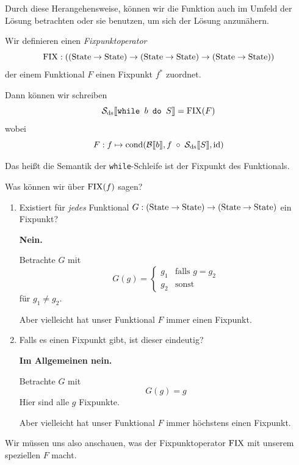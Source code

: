 Durch diese Herangehensweise, können wir die Funktion auch im Umfeld der Lösung betrachten oder sie benutzen, um sich der Lösung anzunähern.

\begin{definition}
    Wir definieren einen \emph{Fixpunktoperator} \[
        \operatorname{FIX} : ((\operatorname{State} \to \operatorname{State}) \to (\operatorname{State} \to \operatorname{State}) \to (\operatorname{State} \to \operatorname{State}))
    \]
    der einem Funktional $F$ einen Fixpunkt $f^*$ zuordnet.

    Dann können wir schreiben \[
        \mathcal{S}_{\text{ds}}\mathrm{[}\kern-.14em\mathrm{[}\texttt{while $b$ do $S$}\mathrm{]}\kern-.14em\mathrm{]} = \operatorname{FIX}(F)
    \]
    wobei \[
        F : f \mapsto \operatorname{cond}(\mathcal{B}\mathrm{[}\kern-.14em\mathrm{[} b\mathrm{]}\kern-.14em\mathrm{]}, f \;\circ\; \mathcal{S}_{\text{ds}}\mathrm{[}\kern-.14em\mathrm{[} S\mathrm{]}\kern-.14em\mathrm{]}, \operatorname{id})
    \]
\end{definition}

Das heißt die Semantik der \texttt{while}-Schleife ist der Fixpunkt des Funktionals.

\begin{question}
    Was können wir über $\operatorname{FIX}(f)$ sagen?
    \begin{enumerate}
        \item Existiert für \emph{jedes} Funktional $G : (\operatorname{State} \to \operatorname{State}) \to (\operatorname{State} \to \operatorname{State})$ ein Fixpunkt?

            \textbf{Nein.}

            Betrachte $G$ mit \[
                G(g) = \begin{cases}
                    g_1 & \text{falls } g = g_2 \\
                    g_2 & \text{sonst}
                \end{cases}
            \]
            für $g_1 \neq g_2$.

            Aber vielleicht hat unser Funktional $F$ immer einen Fixpunkt.

        \item Falls es einen Fixpunkt gibt, ist dieser eindeutig?

            \textbf{Im Allgemeinen nein.}

            Betrachte $G$ mit \[ G(g) = g \] Hier sind alle $g$ Fixpunkte.

            Aber vielleicht hat unser Funktional $F$ immer höchstens einen Fixpunkt.
    \end{enumerate}
\end{question}

\par\bigskip
Wir müssen uns also anschauen, was der Fixpunktoperator $\operatorname{FIX}$ mit unserem speziellen $F$ macht.

